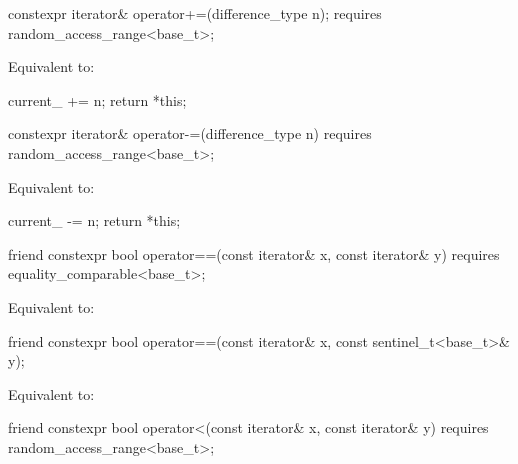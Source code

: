 %
\begin{itemdecl}
constexpr iterator& operator+=(difference_type n);
  requires random_access_range<base_t>;
\end{itemdecl}

\begin{itemdescr}
\pnum
\effects
Equivalent to:
\begin{codeblock}
current_ += n;
return *this;
\end{codeblock}
\end{itemdescr}

%
\begin{itemdecl}
constexpr iterator& operator-=(difference_type n)
  requires random_access_range<base_t>;
\end{itemdecl}

\begin{itemdescr}
\pnum
\effects
Equivalent to:
\begin{codeblock}
current_ -= n;
return *this;
\end{codeblock}
\end{itemdescr}

%
\begin{itemdecl}
friend constexpr bool operator==(const iterator& x, const iterator& y)
  requires equality_comparable<base_t>;
\end{itemdecl}

\begin{itemdescr}
\pnum
\effects
Equivalent to: 
\end{itemdescr}

%
\begin{itemdecl}
friend constexpr bool operator==(const iterator& x, const sentinel_t<base_t>& y);
\end{itemdecl}

\begin{itemdescr}
\pnum
\effects
Equivalent to: 
\end{itemdescr}

%
\begin{itemdecl}
friend constexpr bool operator<(const iterator& x, const iterator& y)
  requires random_access_range<base_t>;
\end{itemdecl}

